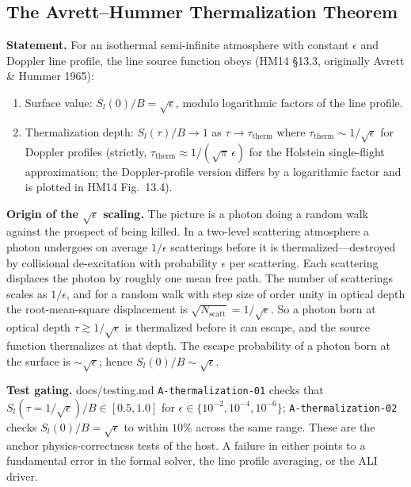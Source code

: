 \documentclass[11pt]{article}
\begin{document}
\subsection{The Avrett--Hummer Thermalization Theorem}
\label{sec:avrett-hummer}

\textbf{Statement.} For an isothermal semi-infinite atmosphere with constant
$\epsilon$ and Doppler line profile, the line source function obeys (HM14
§13.3, originally Avrett \& Hummer 1965):
\begin{enumerate}[label=(\roman*)]
\item Surface value: $S_l(0) / B = \sqrt{\epsilon}$, modulo logarithmic
factors of the line profile.
\item Thermalization depth: $S_l(\tau)/B \to 1$ as $\tau \to \tau_{\text{therm}}$
where $\tau_{\text{therm}} \sim 1/\sqrt{\epsilon}$ for Doppler profiles
(strictly, $\tau_{\text{therm}} \approx 1/(\sqrt{\pi}\,\epsilon)$ for the
Holstein single-flight approximation; the Doppler-profile version differs by
a logarithmic factor and is plotted in HM14 Fig.~13.4).
\end{enumerate}

\textbf{Origin of the $\sqrt{\epsilon}$ scaling.}  The picture is a
photon doing a random walk against the prospect of being killed.  In a
two-level scattering atmosphere a photon undergoes on average
$1/\epsilon$ scatterings before it is thermalized---destroyed by
collisional de-excitation with probability $\epsilon$ per scattering.
Each scattering displaces the photon by roughly one mean free path.
The number of scatterings scales as $1/\epsilon$, and for a random
walk with step size of order unity in optical depth the
root-mean-square displacement is $\sqrt{N_{\text{scatt}}} =
1/\sqrt{\epsilon}$.  So a photon born at optical depth $\tau \gtrsim
1/\sqrt{\epsilon}$ is thermalized before it can escape, and the source
function thermalizes at that depth.  The escape probability of a
photon born at the surface is $\sim \sqrt{\epsilon}$; hence
$S_l(0) / B \sim \sqrt{\epsilon}$.

\textbf{Test gating.} docs/testing.md \texttt{A-thermalization-01} checks that
$S_l(\tau = 1/\sqrt{\epsilon})/B \in [0.5, 1.0]$ for
$\epsilon \in \{10^{-2}, 10^{-4}, 10^{-6}\}$; \texttt{A-thermalization-02}
checks $S_l(0)/B = \sqrt{\epsilon}$ to within $10\%$ across the same range.
These are the anchor physics-correctness tests of the host.  A failure
in either points to a fundamental error in the formal solver, the line
profile averaging, or the ALI driver.
\end{document}
